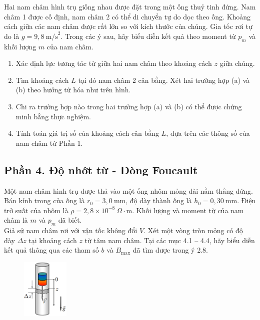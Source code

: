 \noindent Hai nam châm hình trụ giống nhau được đặt trong một ống thuỷ tinh đứng. Nam châm 1 được cố định, nam châm 2 có thể di chuyển tự do dọc theo ống. Khoảng cách giữa các nam châm được rất lớn so với kích thước của chúng. Gia tốc rơi tự do là $g = 9{,}8~\text{m/s}^2$. Trong các ý sau, hãy biểu diễn kết quả theo moment từ $p_m$ và khối lượng $m$ của nam châm.
\begin{enumerate}
  \item Xác định lực tương tác từ giữa hai nam châm theo khoảng cách $z$ giữa chúng.
\end{enumerate}

\begin{enumerate}
  \setcounter{enumi}{1}
  \item Tìm khoảng cách $L$ tại đó nam châm 2 cân bằng. Xét hai trường hợp (a) và (b) theo hướng từ hóa như trên hình.
  \item Chi ra trường hợp nào trong hai trường hợp (a) và (b) có thể được chứng minh bằng thực nghiệm.
  \item Tính toán giá trị số của khoảng cách cân bằng $L$, dựa trên các thông số của nam châm từ Phần 1.
\end{enumerate}

\subsection*{Phần 4. Độ nhớt từ - Dòng Foucault}
\noindent Một nam châm hình trụ được thả vào một ống nhôm mỏng dài nằm thẳng đứng. Bán kính trong của ống là $r_0 = 3{,}0~\text{mm}$, độ dày thành ống là $h_0 = 0{,}30~\text{mm}$. Điện trở suất của nhôm là $\rho = 2{,}8 \times 10^{-8}~\Omega \cdot \text{m}$. Khối lượng và moment từ của nam châm là $m$ và $p_m$ đã biết.\\
\indent Giả sử nam châm rơi với vận tốc không đổi $V$. Xét một vòng tròn mỏng có độ dày $\Delta z$ tại khoảng cách $z$ từ tâm nam châm. Tại các mục 4.1 – 4.4, hãy biểu diễn kết quả thông qua các tham số $b$ và $B_{\text{max}}$ đã tìm được trong ý 2.8.
\begin{figure}[H]
  \centering
  \vspace{0.5cm}
  \includegraphics[width=0.2\textwidth]{Figures/Problems/Fig 2.9.png}
\end{figure}

